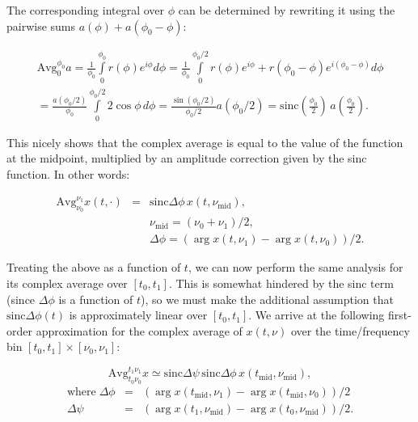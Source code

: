 \documentclass[]{aa}
\begin{document}
The corresponding integral over $\phi$ can be determined by rewriting it using the pairwise sums $a(\phi)+a(\phi_0-\phi)$:

\begin{eqnarray*}
\mathrm{Avg}_0^{\phi_0} a = \frac{1}{\phi_0}\int\limits_0^{\phi_0} r(\phi)e^{i\phi} d\phi = \frac{1}{\phi_0} \int\limits_0^{\phi_0/2} r(\phi)e^{i\phi}+r(\phi_0-\phi)e^{i(\phi_0-\phi)} d\phi \\
= \frac{a(\phi_0/2)}{\phi_0}\int\limits_0^{\phi_0/2} 2 \cos \phi \, d\phi = \frac{\sin (\phi_0/2)}{\phi_0/2} a(\phi_0/2) 
= \mathrm{sinc}(\frac{\phi_0}{2}) \, a(\frac{\phi_0}{2}).
\end{eqnarray*}

This nicely shows that the complex average is equal to the value of the function at the midpoint, multiplied by an amplitude correction given by the sinc function. In other words:

\begin{eqnarray*}
\mathrm{Avg}_{\nu_0}^{\nu_1}x(t,\cdot) & = & \mathrm{sinc}\Delta\phi\, x(t,\nu_\mathrm{mid}),\\
&& \nu_\mathrm{mid}=(\nu_0+\nu_1)/2, \\
&& \Delta\phi = (\arg x(t,\nu_1)-\arg x(t,\nu_0))/2.
\end{eqnarray*} 

Treating the above as a function of $t$, we can now perform the same analysis for its complex average over $[t_0,t_1]$. This is somewhat hindered by the sinc term (since $\Delta\phi$ is a function of $t$), so we must make the additional assumption that $\mathrm{sinc}{\Delta\phi(t)}$ is approximately linear over $[t_0,t_1]$. We arrive at the following first-order approximation for the complex average of $x(t,\nu)$ over the time/frequency bin $[t_0,t_1]\times[\nu_0,\nu_1]$:

\begin{equation}\label{eq:smearing}
\mathrm{Avg}_{t_0\nu_0}^{t_1\nu_1} x \simeq \mathrm{sinc}\Delta\psi\,\mathrm{sinc}\Delta\phi\,x(t_\mathrm{mid},\nu_\mathrm{mid}),
\end{equation}
\begin{eqnarray*}
\mathrm{where}\; \Delta\phi & = & (\arg x(t_\mathrm{mid},\nu_1)-\arg x(t_\mathrm{mid},\nu_0))/2 \\
\Delta\psi & = & (\arg x(t_1,\nu_\mathrm{mid})-\arg x(t_0,\nu_\mathrm{mid}))/2.
\end{eqnarray*}
\end{document}
